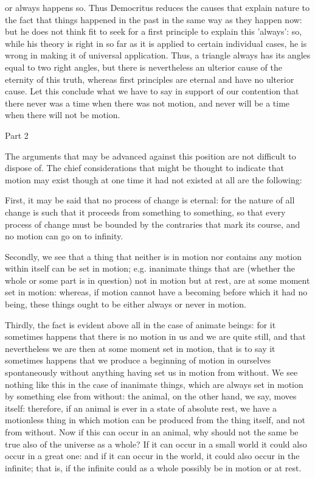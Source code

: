or always happens so. Thus Democritus reduces the causes that explain
nature to the fact that things happened in the past in the same way
as they happen now: but he does not think fit to seek for a first
principle to explain this 'always': so, while his theory is right
in so far as it is applied to certain individual cases, he is wrong
in making it of universal application. Thus, a triangle always has
its angles equal to two right angles, but there is nevertheless an
ulterior cause of the eternity of this truth, whereas first principles
are eternal and have no ulterior cause. Let this conclude what we
have to say in support of our contention that there never was a time
when there was not motion, and never will be a time when there will
not be motion. 

Part 2

The arguments that may be advanced against this position are not difficult
to dispose of. The chief considerations that might be thought to indicate
that motion may exist though at one time it had not existed at all
are the following: 

First, it may be said that no process of change is eternal: for the
nature of all change is such that it proceeds from something to something,
so that every process of change must be bounded by the contraries
that mark its course, and no motion can go on to infinity.

Secondly, we see that a thing that neither is in motion nor contains
any motion within itself can be set in motion; e.g. inanimate things
that are (whether the whole or some part is in question) not in motion
but at rest, are at some moment set in motion: whereas, if motion
cannot have a becoming before which it had no being, these things
ought to be either always or never in motion. 

Thirdly, the fact is evident above all in the case of animate beings:
for it sometimes happens that there is no motion in us and we are
quite still, and that nevertheless we are then at some moment set
in motion, that is to say it sometimes happens that we produce a beginning
of motion in ourselves spontaneously without anything having set us
in motion from without. We see nothing like this in the case of inanimate
things, which are always set in motion by something else from without:
the animal, on the other hand, we say, moves itself: therefore, if
an animal is ever in a state of absolute rest, we have a motionless
thing in which motion can be produced from the thing itself, and not
from without. Now if this can occur in an animal, why should not the
same be true also of the universe as a whole? If it can occur in a
small world it could also occur in a great one: and if it can occur
in the world, it could also occur in the infinite; that is, if the
infinite could as a whole possibly be in motion or at rest.

